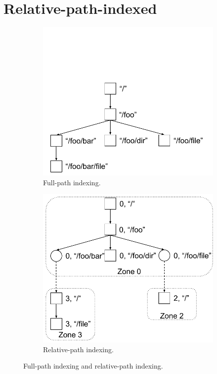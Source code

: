 \section{Relative-path-indexed \betrfs}
\label{sec:rpi}

\begin{figure}
    \begin{subfigure}{.5\textwidth}
        \centering
        \includegraphics[width=.9\linewidth]{proposal/fig/FPI}
        \caption{\label{subfig:FPI} Full-path indexing.}
    \end{subfigure}
    \begin{subfigure}{.5\textwidth}
        \centering
        \includegraphics[width=.9\linewidth]{proposal/fig/RPI}
        \caption{\label{subfig:RPI} Relative-path indexing.}
    \end{subfigure}
    \caption[Full-path indexing and relative-path indexing]{\label{fig:FPIRPI}
        Full-path indexing and relative-path indexing.}
\end{figure}

